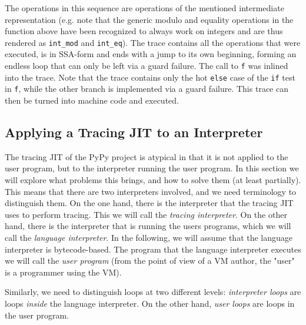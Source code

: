 \documentclass{acm_proc_article-sp}
\let\oldcite=\cite
\renewcommand\cite[1]{\ifthenelse{\equal{#1}{XXX}}{[citation~needed]}{\oldcite{#1}}}
\begin{document}
The operations in this sequence are operations of the mentioned intermediate
representation (e.g. note that the generic modulo and equality operations in the
function above have been recognized to always work on integers and are thus
rendered as \texttt{int\_mod} and \texttt{int\_eq}). The trace contains all the
operations that were executed, is in SSA-form \cite{XXX} and ends with a jump
to its own beginning, forming an endless loop that can only be left via a guard
failure. The call to \texttt{f} was inlined into the trace. Note that the trace
contains only the hot \texttt{else} case of the \texttt{if} test in \texttt{f},
while the other branch is implemented via a guard failure. This trace can then
be turned into machine code and executed.



\subsection{Applying a Tracing JIT to an Interpreter}

The tracing JIT of the PyPy project is atypical in that it is not applied to the
user program, but to the interpreter running the user program. In this section
we will explore what problems this brings, and how to solve them (at least
partially). This means that there are two interpreters involved, and we need
terminology to distinguish them. On the one hand, there is the interpreter that
the tracing JIT uses to perform tracing. This we will call the \emph{tracing
interpreter}. On the other hand, there is the interpreter that is running the
users programs, which we will call the \emph{language interpreter}. In the
following, we will assume that the language interpreter is bytecode-based. The
program that the language interpreter executes we will call the \emph{user
program} (from the point of view of a VM author, the "user" is a programmer
using the VM).

Similarly, we need to distinguish loops at two different levels:
\emph{interpreter loops} are loops \emph{inside} the language interpreter. On
the other hand, \emph{user loops} are loops in the user program.
\end{document}
